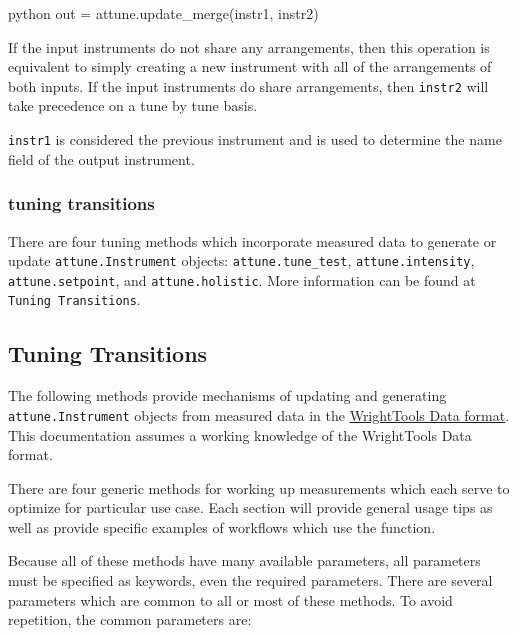 \begin{codefragment}{python}
out = attune.update_merge(instr1, instr2)
\end{codefragment}

If the input instruments do not share any arrangements, then this
operation is equivalent to simply creating a new instrument with all of
the arrangements of both inputs. If the input instruments do share
arrangements, then \texttt{instr2} will take precedence on a tune by
tune basis.

\texttt{instr1} is considered the previous instrument and is used to
determine the name field of the output instrument.

\hypertarget{tuning-transitions}{%
\subsubsection{tuning transitions}\label{tuning-transitions}}

There are four tuning methods which incorporate measured data to
generate or update \texttt{attune.Instrument} objects:
\texttt{attune.tune\_test}, \texttt{attune.intensity},
\texttt{attune.setpoint}, and \texttt{attune.holistic}. More information
can be found at \texttt{Tuning\ Transitions}.

\hypertarget{tuningux20transitions}{%
\subsection{Tuning Transitions}\label{tuningux20transitions}}

The following methods provide mechanisms of updating and generating
\texttt{attune.Instrument} objects from measured data in the
\href{https://wright.tools/en/stable/data.html}{WrightTools Data
format}. This documentation assumes a working knowledge of the
WrightTools Data format.

There are four generic methods for working up measurements which each
serve to optimize for particular use case. Each section will provide
general usage tips as well as provide specific examples of workflows
which use the function.

Because all of these methods have many available parameters, all
parameters must be specified as keywords, even the required parameters.
There are several parameters which are common to all or most of these
methods. To avoid repetition, the common parameters are:

